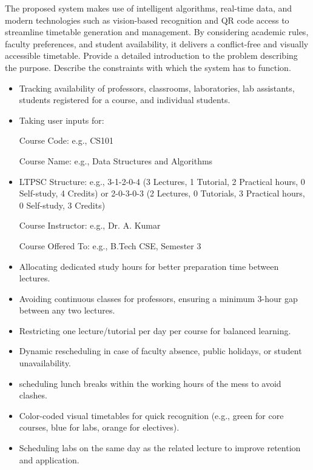 \documentclass[12pt]{article}
\begin{document}
The proposed system makes use of intelligent algorithms, real-time data, and modern technologies such as vision-based recognition and QR code access to streamline timetable generation and management. By considering academic rules, faculty preferences, and student availability, it delivers a conflict-free and visually accessible timetable.
Provide a detailed introduction to the problem describing the purpose. Describe the constraints with which the system has to function.
\begin{itemize}
    \item Tracking availability of professors, classrooms, laboratories, lab assistants, students registered for a course, and individual students.

\item Taking user inputs for:

Course Code: e.g., CS101

Course Name: e.g., Data Structures and Algorithms

\item LTPSC Structure: e.g., 3-1-2-0-4 (3 Lectures, 1 Tutorial, 2 Practical hours, 0 Self-study, 4 Credits) or 2-0-3-0-3 (2 Lectures, 0 Tutorials, 3 Practical hours, 0 Self-study, 3 Credits)

Course Instructor: e.g., Dr. A. Kumar

Course Offered To: e.g., B.Tech CSE, Semester 3

\item Allocating dedicated study hours for better preparation time between lectures.

\item Avoiding continuous classes for professors, ensuring a minimum 3-hour gap between any two lectures.

\item Restricting one lecture/tutorial per day per course for balanced learning.

\item Dynamic rescheduling in case of faculty absence, public holidays, or student unavailability.

\item scheduling lunch breaks within the working hours of the mess to avoid clashes.

\item Color-coded visual timetables for quick recognition (e.g., green for core courses, blue for labs, orange for electives).

\item Scheduling labs on the same day as the related lecture to improve retention and application.


\end{itemize}
\end{document}
